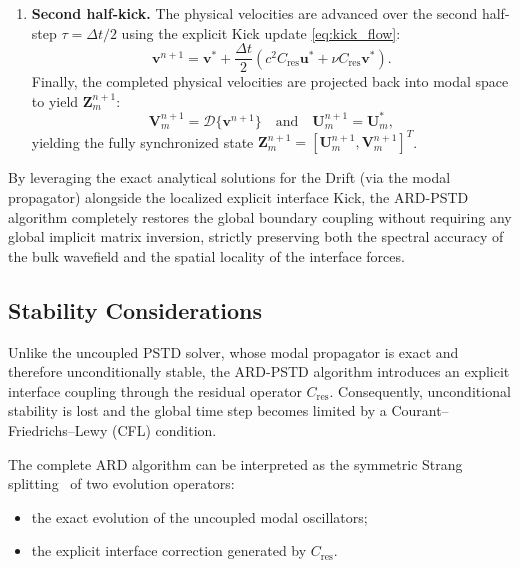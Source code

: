 \documentclass{Configuration_Files/PoliMi3i_thesis}
\begin{document}
\begin{enumerate}
\item
\textbf{Second half-kick.}
The physical velocities are advanced over the second half-step $\tau = \Delta t/2$ using the explicit Kick update \eqref{eq:kick_flow}:
\begin{equation*}
    \mathbf{v}^{n+1} = \mathbf{v}^* + \frac{\Delta t}{2} \left( c^2 C_{\mathrm{res}} \mathbf{u}^* + \nu C_{\mathrm{res}} \mathbf{v}^* \right).
\end{equation*}
Finally, the completed physical velocities are projected back into modal space to yield $\mathbf Z_m^{n+1}$:
\begin{equation*}
    \mathbf{V}_m^{n+1} = \mathcal{D} \{ \mathbf{v}^{n+1} \} \quad \text{and} \quad \mathbf{U}_m^{n+1} = \mathbf{U}_m^*,
\end{equation*}
yielding the fully synchronized state $\mathbf{Z}_m^{n+1} = [\mathbf{U}_m^{n+1}, \mathbf{V}_m^{n+1}]^T$.

\end{enumerate}

By leveraging the exact analytical solutions for the Drift (via the modal propagator) alongside the localized explicit interface Kick, the ARD-PSTD algorithm completely restores the global boundary coupling without requiring any global implicit matrix inversion, strictly preserving both the spectral accuracy of the bulk wavefield and the spatial locality of the interface forces.

\subsection{Stability Considerations}

Unlike the uncoupled PSTD solver, whose modal propagator is exact and therefore unconditionally stable, the ARD-PSTD algorithm introduces an explicit interface coupling through the residual operator $C_{\mathrm{res}}$. Consequently, unconditional stability is lost and the global time step becomes limited by a Courant--Friedrichs--Lewy (CFL) condition.

The complete ARD algorithm can be interpreted as the symmetric Strang splitting~\cite{strang_construction_1968} of two evolution operators:

\begin{itemize}
    \item the exact evolution of the uncoupled modal oscillators;
    \item the explicit interface correction generated by $C_{\mathrm{res}}$.
\end{itemize}
\end{document}
